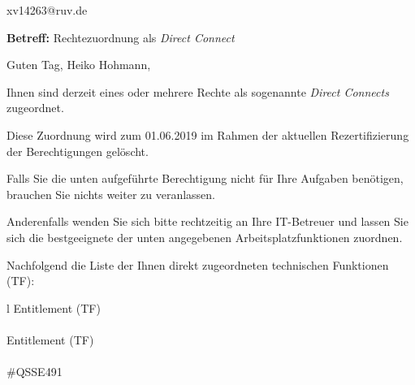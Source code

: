 \documentclass[a4paper,landscape,12pt]{letter}
\begin{document}
\begin{letter}{xv14263@ruv.de\hfill \break}
\begin{normalsize}
	\opening{\textbf{Betreff:} Rechtezuordnung als \emph{Direct Connect}}
	\begin{normalsize} \hfill
	\end{normalsize}

	\begin{normalsize}
		Guten Tag, 
	Heiko Hohmann, \hfill \break
	\end{normalsize}
	\end{normalsize}
	
\begin{normalsize}
	Ihnen sind derzeit eines oder mehrere Rechte als sogenannte \emph{Direct Connects} zugeordnet.
	
	Diese Zuordnung wird zum 01.06.2019 im Rahmen der aktuellen Rezertifizierung der Berechtigungen gelöscht.
	
	Falls Sie die unten aufgeführte Berechtigung nicht für Ihre Aufgaben benötigen, 
	brauchen Sie nichts weiter zu veranlassen.
	
	Anderenfalls wenden Sie sich bitte rechtzeitig an Ihre IT-Betreuer 
	und lassen Sie sich die bestgeeignete der unten angegebenen Arbeitsplatzfunktionen zuordnen.
	\end{normalsize}
	
\begin{normalsize}
	Nachfolgend die Liste der Ihnen direkt zugeordneten technischen Funktionen (TF):

	\begin{longtable}{l}
		Entitlement (TF) \\ \hline
		\endfirsthead
		\\\hline
		Entitlement (TF) \\ \hline
		\endhead %
		\multicolumn{1}{r@{}}{Fortsetzung \ldots}\\
		\endfoot
		\hline
		\endlastfoot
	\#QSSE491\\
	\end{longtable}
	\end{normalsize}
	

\end{letter}
\end{document}
